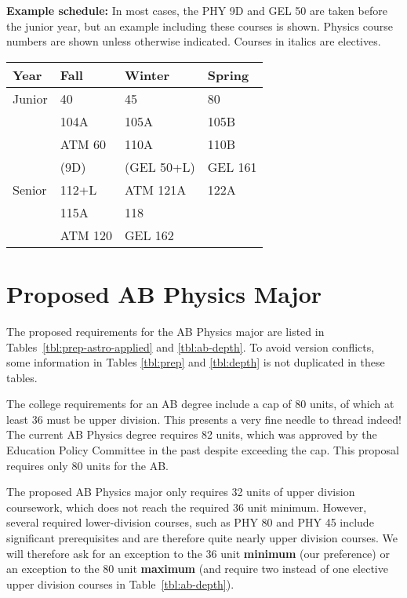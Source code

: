 \documentclass[12pt]{article}
\begin{document}
\noindent
{\bf Example schedule:} In most cases, the PHY 9D and GEL 50 are taken
before the junior year, but an example including these courses is
shown.  Physics course numbers are shown unless otherwise indicated.
Courses in italics are electives.
\begin{center}
\begin{tabular}{|l|l|l|l|}
\hline
Year      & Fall    & Winter & Spring \\
\hline
Junior    & 40         & 45           & 80 \\
          & 104A       & 105A         & 105B\\
          & ATM 60     & 110A         & 110B \\
          & (9D)       & (GEL 50+L)   & GEL 161\\
\hline
Senior   & 112+L       & ATM 121A     & 122A \\
         & 115A        & 118          & \\
         & ATM 120     & GEL 162      & \\
\hline
\end{tabular}
\end{center}



\newpage
\section{Proposed AB Physics Major}
\label{sec:ab}

The proposed requirements for the AB Physics major are listed in
Tables~\ref{tbl:prep-astro-applied} and \ref{tbl:ab-depth}.  To avoid
version conflicts, some information in Tables \ref{tbl:prep} and
\ref{tbl:depth} is not duplicated in these tables.

The college requirements for an AB degree include a cap of 80
units, of which at least 36 must be upper division.  This presents a
very fine needle to thread indeed!  The current AB Physics degree
requires 82 units, which was approved by the Education Policy
Committee in the past despite exceeding the cap.  This proposal
requires only 80 units for the AB.

The proposed AB Physics major only requires 32 units of upper division coursework, which
does not reach the required 36 unit minimum.  However, several
required lower-division courses, such as PHY 80 and PHY 45 include
significant prerequisites and are therefore quite nearly upper
division courses.  We will therefore ask for an exception to the 36
unit {\bf minimum} (our preference) or an exception to the 80 unit
{\bf maximum} (and require two instead of one elective upper division
courses in Table~\ref{tbl:ab-depth}).
\end{document}
